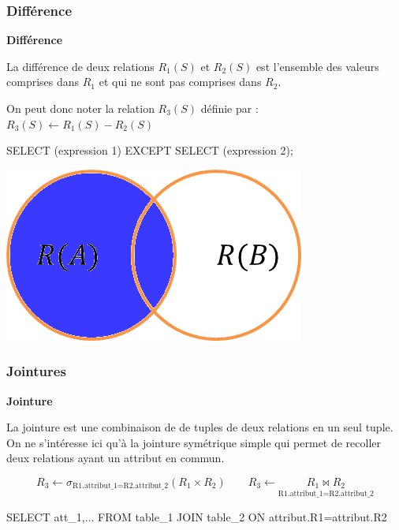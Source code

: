\documentclass[10pt]{article}
\begin{document}
\subsubsection{Différence}
\begin{defi}
\begin{minipage}[c]{.75\linewidth}
\textbf{Différence}

La différence de deux relations $R_1(S)$ et $R_2(S)$ est l'ensemble des valeurs comprises dans $R_1$ et qui ne sont pas comprises dans $R_2$. 

On peut donc noter la relation $R_3(S)$ définie par : $R_3(S)\leftarrow R_1(S)-R_2(S)$

\begin{envsql}
\begin{sql}
SELECT  (expression 1) EXCEPT SELECT (expression 2);
\end{sql}
\end{envsql}

\end{minipage}\hfill
\begin{minipage}[c]{.2\linewidth}
\begin{center}
\includegraphics[width=.95\textwidth]{images/diff}
\end{center}
\end{minipage}
\end{defi}

\subsubsection{Jointures}

\begin{defi}

\textbf{Jointure}

La jointure est une combinaison de de tuples de deux relations en un seul tuple. On ne s'intéresse ici qu'à la jointure symétrique simple qui permet de recoller deux relations ayant un attribut en commun. 

$$ 
R_3 \leftarrow \sigma_{\text{R1.attribut\_1=R2.attribut\_2}} (R_1\times R_2) \quad \quad 
R_3 \leftarrow \underset{\text{R1.attribut\_1=R2.attribut\_2}}{R_1 \bowtie R_2}
$$

\begin{envsql}
\begin{sql}
SELECT att_1,... FROM table_1 JOIN table_2 ON attribut.R1=attribut.R2
\end{sql}
\end{envsql}

\end{defi}
\end{document}
